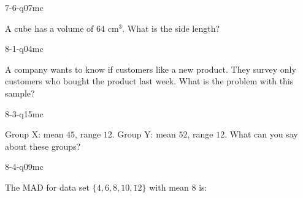 \begin{practiceQuestion}{7-6-q07}{mc}
\begin{questionText}
A cube has a volume of $64$ cm$^3$. What is the side length?
\end{questionText}
\end{practiceQuestion}

\begin{practiceQuestion}{8-1-q04}{mc}
\begin{questionText}
A company wants to know if customers like a new product. They survey only customers who bought the product last week. What is the problem with this sample?
\end{questionText}
\end{practiceQuestion}

\begin{practiceQuestion}{8-3-q15}{mc}
\begin{questionText}
Group X: mean $45$, range $12$. Group Y: mean $52$, range $12$. What can you say about these groups?
\end{questionText}
\end{practiceQuestion}

\begin{practiceQuestion}{8-4-q09}{mc}
\begin{questionText}
The MAD for data set $\{4, 6, 8, 10, 12\}$ with mean $8$ is:
\end{questionText}
\end{practiceQuestion}

